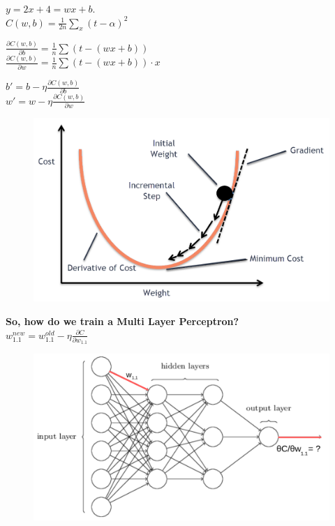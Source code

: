 \documentclass[10pt, compress]{beamer}
\begin{document}
\begin{frame}
  \vspace{1cm}
  \begin{multicols}{2}
  $y = 2x + 4 = wx + b$.\\
  $ C(w, b) = \frac{1}{2n}\sum_x (t-\alpha)^2$

  $\frac{\partial C(w, b)}{\partial b} = \frac{1}{n}\sum(t - (wx + b))$ \\ \hfill \break
  $\frac{\partial C(w, b)}{\partial w} = \frac{1}{n}\sum(t - (wx + b)) \cdot x$ \\ \hfill \break

  $b' = b - \eta \frac{\partial C(w, b)}{\partial b}$ \\
  $w' = w - \eta \frac{\partial C(w, b)}{\partial w}$

  \columnbreak

  \begin{figure}
    \includegraphics[width=1\linewidth]{imgs/gd_3}
  \end{figure}
  \end{multicols}
\end{frame}

\begin{frame}
  \textbf{So, how do we train a Multi Layer Perceptron?} \\
  \Large{$w_{1.1}^{new} = w_{1.1}^{old} - \eta \frac{\partial C}{\partial w_{1.1}}$}
  \begin{figure}
    \includegraphics[width=.8\linewidth]{imgs/mlp_backprop}
  \end{figure}
\end{frame}
\end{document}

